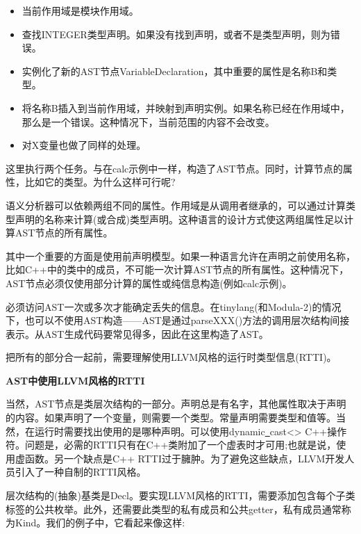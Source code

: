 \begin{itemize}
\item 当前作用域是模块作用域。
\item 查找INTEGER类型声明。如果没有找到声明，或者不是类型声明，则为错误。
\item 实例化了新的AST节点VariableDeclaration，其中重要的属性是名称B和类型。
\item 将名称B插入到当前作用域，并映射到声明实例。如果名称已经在作用域中，那么是一个错误。这种情况下，当前范围的内容不会改变。
\item 对X变量也做了同样的处理。
\end{itemize}

这里执行两个任务。与在calc示例中一样，构造了AST节点。同时，计算节点的属性，比如它的类型。为什么这样可行呢?\par

语义分析器可以依赖两组不同的属性。作用域是从调用者继承的，可以通过计算类型声明的名称来计算(或合成)类型声明。这种语言的设计方式使这两组属性足以计算AST节点的所有属性。\par

其中一个重要的方面是使用前声明模型。如果一种语言允许在声明之前使用名称，比如C++中的类中的成员，不可能一次计算AST节点的所有属性。这种情况下，AST节点必须仅使用部分计算的属性或纯信息构造(例如calc示例)。\par

必须访问AST一次或多次才能确定丢失的信息。在tinylang(和Modula-2)的情况下，也可以不使用AST构造——AST是通过parseXXX()方法的调用层次结构间接表示。从AST生成代码要常见得多，因此在这里构造了AST。\par

把所有的部分合一起前，需要理解使用LLVM风格的运行时类型信息(RTTI)。\par

\hspace*{\fill} \par %
\textbf{AST中使用LLVM风格的RTTI}

当然，AST节点是类层次结构的一部分。声明总是有名字，其他属性取决于声明的内容。如果声明了一个变量，则需要一个类型。常量声明需要类型和值等。当然，在运行时需要找出使用的是哪种声明。可以使用dynamic\underline{~}cast<> C++操作符。问题是，必需的RTTI只有在C++类附加了一个虚表时才可用;也就是说，使用虚函数。另一个缺点是C++ RTTI过于臃肿。为了避免这些缺点，LLVM开发人员引入了一种自制的RTTI风格。\par

层次结构的(抽象)基类是Decl。要实现LLVM风格的RTTI，需要添加包含每个子类标签的公共枚举。此外，还需要此类型的私有成员和公共getter，私有成员通常称为Kind。我们的例子中，它看起来像这样:\par

